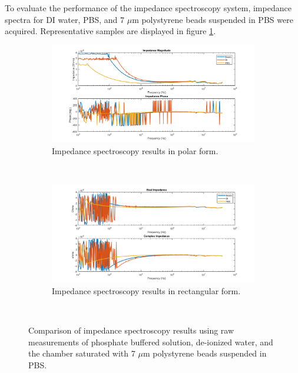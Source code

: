 \par To evaluate the performance of the impedance spectroscopy system, impedance spectra for DI water, PBS, and 7 $\mu$m polystyrene beads suspended in PBS were acquired. Representative samples are displayed in figure \ref{fig:IS_data_beads_pbs_DI_comp}. 

\begin{figure}[h]
    \centering
    \begin{subfigure}[b]{0.9\textwidth}
        \centering
        \includegraphics[width=\textwidth]{images/raw_IS_data_mag_phase.png}
        \caption{Impedance spectroscopy results in polar form.}
    \end{subfigure}
    \\
    \vspace{0.1 in}
    \begin{subfigure}[b]{0.9\textwidth}
        \centering
        \includegraphics[width=\textwidth]{images/raw_IS_data_real_imag.png}
        \caption{Impedance spectroscopy results in rectangular form.}
    \end{subfigure}
    \\
    \caption[PBS, DI, microbead IS Raw data comparison.]{Comparison of impedance spectroscopy results using raw measurements of phosphate buffered solution, de-ionized water, and the chamber saturated with 7 $\mu$m polystyrene beads suspended in PBS.}
    \label{fig:IS_data_beads_pbs_DI_comp}
\end{figure}


